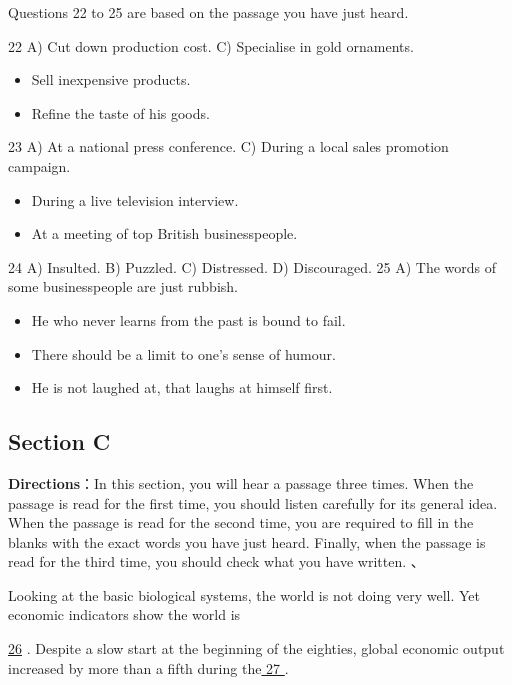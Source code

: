 \documentclass[UTF8,11pt]{ctexart}
\begin{document}
Questions 22 to 25 are based on the passage you have just heard.


22 A) Cut down production cost. C) Specialise in gold ornaments.


\begin{itemize}[leftmargin=2em,itemsep=.2em,topsep=.4em]\item[B.] Sell inexpensive products.
\item[D.] Refine the taste of his goods.
\end{itemize}

23 A) At a national press conference. C) During a local sales promotion campaign.


\begin{itemize}[leftmargin=2em,itemsep=.2em,topsep=.4em]\item[B.] During a live television interview.
\item[D.] At a meeting of top British businesspeople.
\end{itemize}

24 A) Insulted. B) Puzzled. C) Distressed. D) Discouraged. 25 A) The words of some businesspeople are just rubbish.


\begin{itemize}[leftmargin=2em,itemsep=.2em,topsep=.4em]\item[B.] He who never learns from the past is bound to fail.
\item[C.] There should be a limit to one’s sense of humour.
\item[D.] He is not laughed at, that laughs at himself first.
\end{itemize}

\subsection*{Section C}


\textbf{Directions}：In this section, you will hear a passage three times. When the passage is read for the first time, you should listen carefully for its general idea. When the passage is read for the second time, you are required to fill in the blanks with the exact words you have just heard. Finally, when the passage is read for the third time, you should check what you have written. 、


Looking at the basic biological systems, the world is not doing very well. Yet economic indicators show the world is


\uline{26} . Despite a slow start at the beginning of the eighties, global economic output increased by more than a fifth during the\uline{ 27 }.
\end{document}
